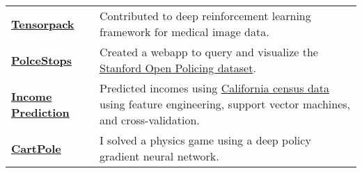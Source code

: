 \documentclass[a4paper,12pt]{article}
\newcommand{\ressubheading}[4]{
        \textbf{#1} \hfill #2\\
        \textit{#3} \hfill #4 \\}
\begin{document}
      \begin{tabularx}{\textwidth}{p{3cm}>{\arraybackslash}X}  %



      \bfseries{\href{https://github.com/amiralansary/tensorpack-medical}{Tensorpack}} & Contributed to deep reinforcement learning framework for medical image data.\\

      \bfseries{\href{https://github.com/ncf-ds/police-traffic-stop-explorer}{PolceStops}} & Created a webapp to query and visualize the \href{https://openpolicing.stanford.edu/data/}{Stanford Open Policing dataset}.\\


\bfseries{\href{https://www.flickr.com/photos/richarddecal/sets/72157655653035375/with/19534941902/}{Income \mbox{Prediction}}} & Predicted incomes using \href{https://www.aaai.org/Papers/KDD/1996/KDD96-033.pdf}{California census data} using feature engineering, support vector machines, and cross-validation.\\

      \bfseries{\href{https://github.com/crypdick/policy-gradients-cartpole/blob/master/capstone_report.pdf}{CartPole}} &  I solved a physics game using a deep policy gradient neural network.
      \end{tabularx}

\end{document}

